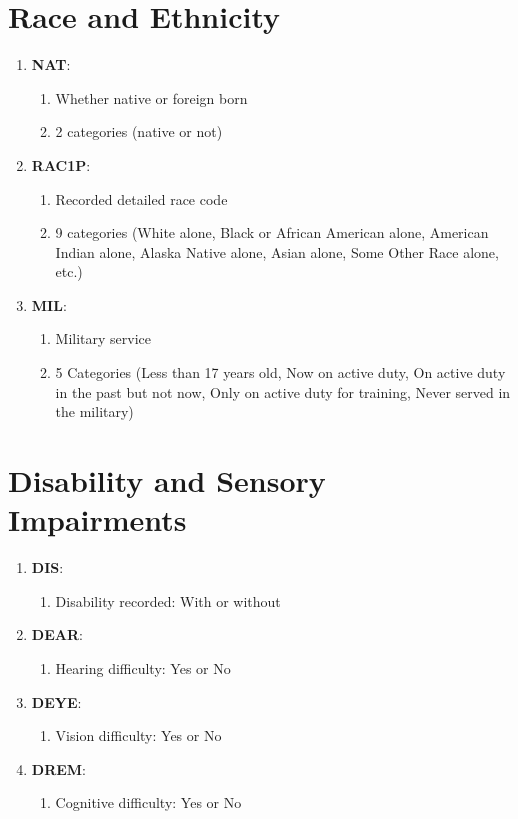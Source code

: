 \section*{Race and Ethnicity}
\begin{enumerate}
  \item \textbf{NAT}:
\begin{enumerate}
    \item  Whether native or foreign born
    \item 2 categories (native or not)
  \end{enumerate}
  
  \item \textbf{RAC1P}:
  \begin{enumerate}
    \item Recorded detailed race code
    \item 9 categories (White alone, Black or African American alone, American Indian alone, Alaska Native alone, Asian alone, Some Other Race alone, etc.)
  \end{enumerate}
  
    \item \textbf{MIL}: 
  \begin{enumerate}
    \item Military service
    \item 5 Categories (Less than 17 years old, Now on active duty, On active duty in the past but not now, Only on active duty for training, Never served in the military)
  \end{enumerate}


\end{enumerate}

\section*{Disability and Sensory Impairments}
\begin{enumerate}
  \item \textbf{DIS}:
\begin{enumerate}
    \item  Disability recorded: With or without
  \end{enumerate}
  
  \item \textbf{DEAR}:
\begin{enumerate}
    \item  Hearing difficulty: Yes or No
  \end{enumerate}

  \item \textbf{DEYE}:
\begin{enumerate}
    \item  Vision difficulty: Yes or No
  \end{enumerate}

    \item \textbf{DREM}:
\begin{enumerate}
    \item  Cognitive difficulty: Yes or No
  \end{enumerate}
\end{enumerate}


